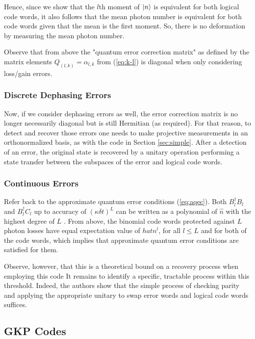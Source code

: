 \documentclass[12]{amsart}
\newcommand\0{\mathbf{0}}
\newcommand\<{\langle}
\renewcommand\>{\rangle}
\begin{document}
Hence, since we show that the $l$th moment of $\ket{n}$ is equivalent for both logical code words, it also follows that the mean photon number is equivalent for both code words given that the mean is the first moment. So, there is no deformation by measuring the mean photon number.

Observe that from above the "quantum error correction matrix" as defined by the matrix elements $Q_{(l, k)} = \alpha_{l, k}$ from (\ref{eq:k-l}) is diagonal when only considering loss/gain errors.

\subsubsection{Discrete Dephasing Errors}

Now, if we consider dephasing errors as well, the error correction matrix is no longer necessarily diagonal but is still Hermitian (as required). For that reason, to detect and recover those errors one needs to make projective measurements in an orthonormalized basis, as with the code in Section \ref{sec:simple}. After a detection of an error, the original state is recovered by a unitary operation performing a state transfer between the subspaces of the error and logical code words.

\subsubsection{Continuous Errors}

Refer back to the approximate quantum error conditions (\ref{eq:aqec}). Both $B_l^\dag B_l$ and $B_l^\dag C_l$ up to accuracy of $(\kappa \delta t)^L$ can be written as a polynomial of $\hat{n}$ with the highest degree of $L$ \cite{michael2016new}. From above, the binomial code words protected against $L$ photon losses have equal expectation value of $hat{n}^l$, for all $l \leq L$ and for both of the code words, which implies that approximate quantum error conditions are satisfied for them.

Observe, however, that this is a theoretical bound on a recovery process when employing this code It remains to identify a specific, tractable process within this threshold. Indeed, the authors show that the simple process of checking parity and applying the appropriate unitary to swap error words and logical code words suffices.
\subsection{GKP Codes}
\end{document}
